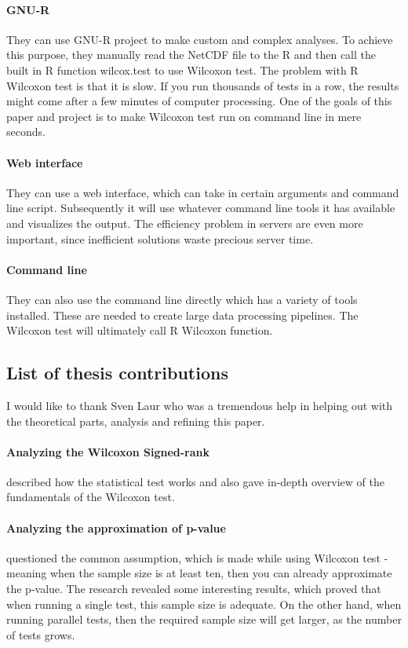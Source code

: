 \documentclass[12pt]{article}
\begin{document}
{\paragraph{GNU-R}
They can use GNU-R project to make custom and complex analyses. To achieve this purpose, they manually read the NetCDF file to the R and then call the built in R function wilcox.test to use Wilcoxon test. The problem with R Wilcoxon test is that it is slow. If you run thousands of tests in a row, the results might come after a few minutes of computer processing. One of the goals of this paper and project is to make Wilcoxon test run on command line in mere seconds.
\paragraph{Web interface}
They can use a web interface, which can take in certain arguments and command line script. Subsequently it will use whatever command line tools it has available and visualizes the output. The efficiency problem in servers are even more important, since inefficient solutions waste precious server time.

\paragraph{Command line}
They can also use the command line directly which has a variety of tools installed. These are needed to create large data processing pipelines. The Wilcoxon test will ultimately call R Wilcoxon function.

\subsection{List of thesis contributions}

I would like to thank Sven Laur who was a tremendous help in helping out with the theoretical parts, analysis and refining this paper.

\paragraph{Analyzing the Wilcoxon Signed-rank} described how the statistical test works and also gave in-depth overview of the fundamentals of the Wilcoxon test.

\paragraph{Analyzing the approximation of p-value} questioned the common assumption, which is made while using Wilcoxon test - meaning when the sample size is at least ten, then you can already approximate the p-value. The research revealed some interesting results, which proved that when running a single test, this sample size is adequate. On the other hand, when running parallel tests, then the required sample size will get larger, as the number of tests grows.

}
\end{document}
